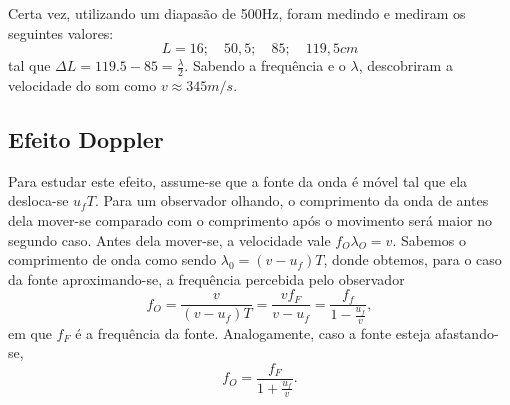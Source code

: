 \documentclass[physicsII_notes.tex]{subfiles}
\begin{document}
Certa vez, utilizando um diapasão de 500Hz, foram medindo e mediram os seguintes valores:
\[
	L = 16;\quad50,5;\quad85;\quad119,5cm
\]
tal que \(\Delta L = 119.5 - 85 = \frac{\lambda }{2}\). Sabendo a frequência e o \(\lambda \), descobriram a velocidade do som como \(v\approx 345m/s.\)
\subsection{Efeito Doppler}
Para estudar este efeito, assume-se que a fonte da onda é móvel tal que ela desloca-se \(u_{f}T\). Para um observador olhando, o comprimento da onda de antes dela
mover-se comparado com o comprimento após o movimento será maior no segundo caso. Antes dela mover-se, a velocidade vale \(f_{O}\lambda_{O} = v\).
Sabemos o comprimento de onda como sendo \(\lambda_{0} = (v-u_{f})T\), donde obtemos, para o caso da fonte aproximando-se, a frequência percebida pelo observador
\[
	f_{O} = \frac{v}{(v-u_{f})T} = \frac{vf_{F}}{v-u_{f}} = \frac{f_{f}}{1-\frac{u_{f}}{v}},
\]
em que \(f_{F}\) é a frequência da fonte. Analogamente, caso a fonte esteja afastando-se,
\[
	f_{O} = \frac{f_{F}}{1+\frac{u_{f}}{v}}.
\]
\end{document}
